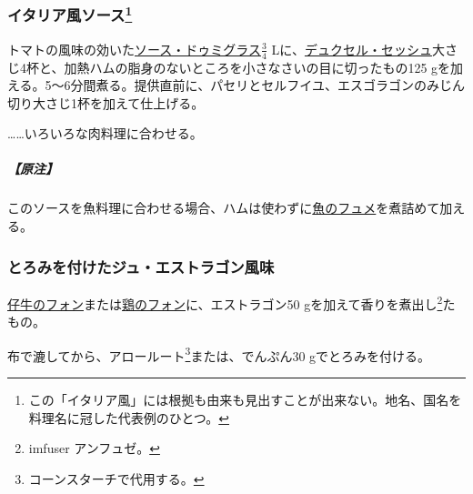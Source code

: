 \begin{recette}
\hypertarget{sauce-italienne}{%
\subsubsection[イタリア風ソース]{\texorpdfstring{イタリア風ソース\footnote{この「イタリア風」には根拠も由来も見出すことが出来ない。地名、国名を料理名に冠した代表例のひとつ。}}{イタリア風ソース}}\label{sauce-italienne}}



トマトの風味の効いた\protect\hyperlink{sauce-demi-glace}{ソース・ドゥミグラス}\(\frac{3}{4}\)
Lに、\protect\hyperlink{duxelles-seche}{デュクセル・セッシュ}大さじ4杯と、加熱ハムの脂身のないところを小さなさいの目に切ったもの125
gを加える。5〜6分間煮る。提供直前に、パセリとセルフイユ、エスゴラゴンのみじん切り大さじ1杯を加えて仕上げる。

\ldots{}\ldots{}いろいろな肉料理に合わせる。

\hypertarget{nota-sauce-italienne}{%
\subparagraph{【原注】}\label{nota-sauce-italienne}}

このソースを魚料理に合わせる場合、ハムは使わずに\protect\hyperlink{fumet-de-poisson}{魚のフュメ}を煮詰めて加える。

\hypertarget{jus-lie-a-lestragon}{%
\subsubsection{とろみを付けたジュ・エストラゴン風味}\label{jus-lie-a-lestragon}}



\protect\hyperlink{jus-de-veau-brun}{仔牛のフォン}または\protect\hyperlink{fonds-de-volaille}{鶏のフォン}に、エストラゴン50
gを加えて香りを煮出し\footnote{imfuser アンフュゼ。}たもの。

布で漉してから、アロールート\footnote{コーンスターチで代用する。}または、でんぷん30
gでとろみを付ける。


\end{recette}
